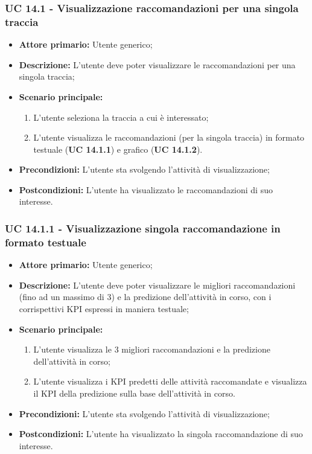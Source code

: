\subsubsection{UC 14.1 - Visualizzazione raccomandazioni per una singola traccia}
\begin{itemize}
	\item \textbf{Attore primario:} Utente generico;
	\item \textbf{Descrizione:} L'utente deve poter visualizzare le raccomandazioni per una singola traccia;
	\item \textbf{Scenario principale:}
		\begin{enumerate}
			\item L'utente seleziona la traccia a cui è interessato;
			\item L'utente visualizza le raccomandazioni (per la singola traccia) in formato testuale (\textbf{UC 14.1.1}) e grafico (\textbf{UC 14.1.2}).
		\end{enumerate}
	\item \textbf{Precondizioni:} L'utente sta svolgendo l'attività di visualizzazione;
	\item \textbf{Postcondizioni:} L'utente ha visualizzato le raccomandazioni di suo interesse.
\end{itemize}

\subsubsection{UC 14.1.1 - Visualizzazione singola raccomandazione in formato testuale}
\begin{itemize}
	\item \textbf{Attore primario:} Utente generico;
	\item \textbf{Descrizione:} L'utente deve poter visualizzare le migliori raccomandazioni (fino ad un massimo di 3) e la predizione dell'attività in corso, con i corrispettivi KPI espressi in maniera testuale;
	\item \textbf{Scenario principale:}
		\begin{enumerate}
			\item L'utente visualizza le 3 migliori raccomandazioni e la predizione dell'attività in corso; 
			\item L'utente visualizza i KPI predetti delle attività raccomandate e visualizza il KPI della predizione sulla base dell'attività in corso.
		\end{enumerate}
	\item \textbf{Precondizioni:} L'utente sta svolgendo l'attività di visualizzazione;
	\item \textbf{Postcondizioni:} L'utente ha visualizzato la singola raccomandazione di suo interesse.
\end{itemize}

